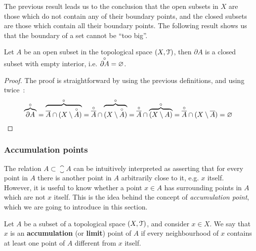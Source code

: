 The previous result leads us to the conclusion that the open subsets in $X$ are those which do not contain any of their boundary points, and the closed subsets are those which contain all their boundary points. The following result shows us that the boundary of a set cannot be ``too big''.

\begin{theorem}
	\label{th:interior-boundary-empty}
	Let $A$ be an open subset in the topological space $(X, \EuScript{T})$, then $\partial A$ is a closed subset  with empty interior, i.e. $\overset{\circ}{\partial A}=\varnothing$.
\end{theorem}

\begin{proof}
	The proof is straightforward by using the previous definitions, and using twice~:
	\[
		\overbrace{\partial A}^{\circ}=\overbrace{\overline{A}\cap(X\setminus \overset{\circ}{A})}^{\circ}=\overset{\circ}{\overline{A}}\cap\overbrace{(X\setminus \overset{\circ}{A})}^{\circ}=\overset{\circ}{\overline{A}}\cap\overbrace{(X\setminus A)}^{\circ}=\overset{\circ}{\overline{A}}\cap(X\setminus \overline{A})=\varnothing
	\]
\end{proof}

\subsubsection{Accumulation points}\label{subsubsec:accumulation-points}

The relation $A\subset \closure{A}$ can be intuitively interpreted as asserting that for every point in $A$ there is another point in $A$ arbitrarily close to it, e.g. $x$ itself. However, it is useful to know whether a point $x\in A$ has surrounding points in $A$ which are not $x$ itself. This is the idea behind the concept of \emph{accumulation point}, which we are going to introduce in this section.

\begin{definition}
	\label{def:accumulation-point}
	Let $A$ be a subset of a topological space $(X,\EuScript{T})$, and consider $x\in X$. We say that $x$ is an \textbf{accumulation} (or \textbf{limit}) point of $A$ if every neighbourhood of $x$ contains at least one point of $A$ different from $x$ itself.
\end{definition}